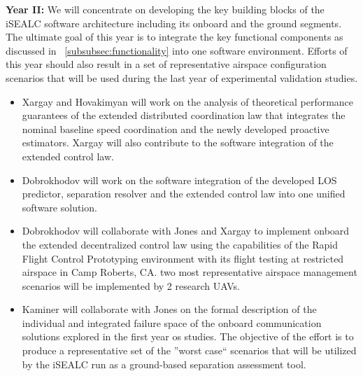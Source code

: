 \documentclass[letter,onecolumn,12pt]{aiaa-tc}
\newcommand{\1}{1_n}
\begin{document}
\textbf{Year II:} We will concentrate on developing the key building blocks of the iSEALC software architecture
including its onboard and the ground segments. The ultimate goal of this year is to integrate the key functional
components as discussed in ~\ref{subsubsec:functionality} into one software environment. Efforts of this year
should also result in a set of representative airspace configuration scenarios that will be used during the last
year of experimental validation studies.
\vspace{-3mm}
\begin{itemize}
\setlength{\itemsep}{-4pt}
    \item Xargay and Hovakimyan will work on the analysis of theoretical performance guarantees of the extended distributed coordination law that integrates the nominal baseline speed coordination and the newly developed proactive estimators. Xargay will also contribute to the software integration of the extended control law.

    \item Dobrokhodov will work on the software integration of the developed LOS predictor, separation resolver and the extended control law into one unified software solution.

    \item Dobrokhodov will collaborate with Jones and Xargay to implement onboard the extended decentralized control law using the capabilities of the Rapid Flight Control Prototyping environment with its flight testing at restricted airspace in Camp Roberts, CA. two most representative airspace management scenarios will be implemented by 2 research UAVs.

    \item Kaminer will collaborate with Jones on the formal description of the individual and integrated failure space of the onboard communication solutions explored in the first year os studies. The objective of the effort is to produce a representative set of the ''worst case`` scenarios that will be utilized by the iSEALC run as a ground-based separation assessment tool.
\end{itemize}
\vspace{-2mm}
\end{document}
